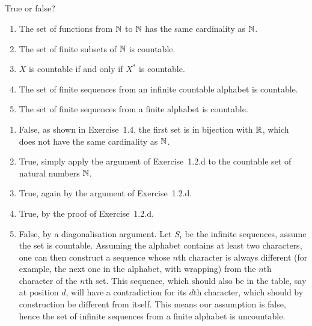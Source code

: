 \subsection{} %
True or false?
\begin{enumerate}
	\item The set of functions from \(\mathbb{N}\) to \(\mathbb{N}\)
	has the same cardinality as \(\mathbb{N}\).
	\item The set of finite subsets of \(\mathbb{N}\) is countable.
	\item \(X\) is countable if and only if \(X^*\) is countable.
	\item The set of finite sequences
	from an infinite countable alphabet is countable.
	\item The set of finite sequences from a finite alphabet is countable.
\end{enumerate}

\begin{solution}
\begin{enumerate}
	\item False, as shown in Exercise~1.4,
	the first set is in bijection with \(\mathbb{R}\),
	which does not have the same cardinality as \(\mathbb{N}\).
	\item True, simply apply the argument of Exercise~1.2.d
	to the countable set of natural numbers \(\mathbb{N}\).
	\item True, again by the argument of Exercise~1.2.d.
	\item True, by the proof of Exercise~1.2.d.
	\item False, by a diagonalisation argument.
	Let \(S_i\) be the infinite sequences,
	assume the set is countable.
	Assuming the alphabet contains at least two characters,
	one can then construct a sequence whose \(n\)th character
	is always different
	(for example, the next one in the alphabet, with wrapping)
	from the \(n\)th character of the \(n\)th set.
	This sequence, which should also be in the table,
	say at position \(d\),
	will have a contradiction for its \(d\)th character,
	which should by construction be different from itself.
	This means our assumption is false,
	hence the set of infinite sequences
	from a finite alphabet is uncountable.
\end{enumerate}
\end{solution}
